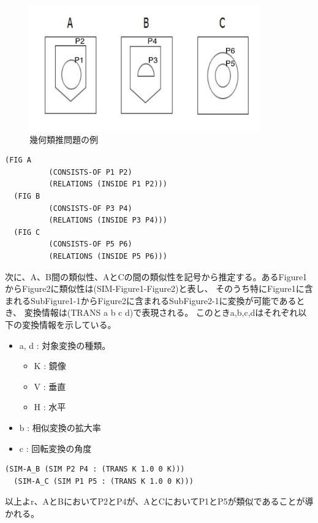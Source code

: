 \documentclass[uplatex]{jsarticle}
\begin{document}
\begin{figure}
  \begin{center}
    \includegraphics[width=10cm]{img/abc_comparison.png}
    \caption{幾何類推問題の例}
  \end{center}
\end{figure}

\begin{lstlisting}[basicstyle=\ttfamily\footnotesize, frame=single]
  (FIG A
          (CONSISTS-OF P1 P2)
          (RELATIONS (INSIDE P1 P2)))
  (FIG B
          (CONSISTS-OF P3 P4)
          (RELATIONS (INSIDE P3 P4)))
  (FIG C
          (CONSISTS-OF P5 P6)
          (RELATIONS (INSIDE P5 P6)))
\end{lstlisting}

次に、A、B間の類似性、AとCの間の類似性を記号から推定する。あるFigure1からFigure2に類似性は(SIM-Figure1-Figure2)と表し、
そのうち特にFigure1に含まれるSubFigure1-1からFigure2に含まれるSubFigure2-1に変換が可能であるとき、
変換情報は(TRANS a b c d)で表現される。
このときa,b,c,dはそれぞれ以下の変換情報を示している。
\begin{itemize}
  \item a, d : 対象変換の種類。
  \begin{itemize}
    \item K : 鏡像
    \item V : 垂直
    \item H : 水平
  \end{itemize}
  \item b : 相似変換の拡大率
  \item c : 回転変換の角度
\end{itemize}

\begin{lstlisting}[basicstyle=\ttfamily\footnotesize, frame=single]
  (SIM-A_B (SIM P2 P4 : (TRANS K 1.0 0 K)))
  (SIM-A_C (SIM P1 P5 : (TRANS K 1.0 0 K)))
\end{lstlisting}
以上よr、AとBにおいてP2とP4が、AとCにおいてP1とP5が類似であることが導かれる。
\end{document}
